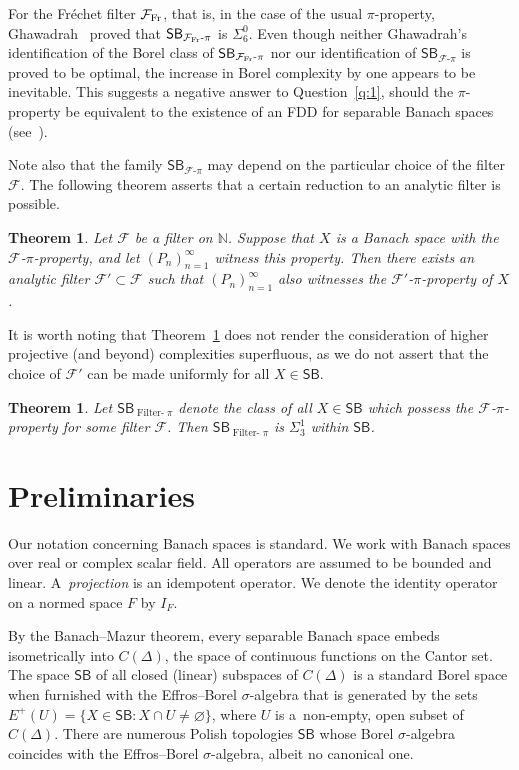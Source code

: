 \documentclass[12pt,fleqn]{amsart}
\newcounter{maintheorem}
\newtheorem{mainth}[maintheorem]{Theorem}
\theoremstyle{definition}
\theoremstyle{remark}
\begin{document}
For the Fréchet filter $\mathcal{F}_{{\rm Fr}}$, that is, in the case of the usual \(\pi\)-property, Ghawadrah~\cite{GhaFund} proved that $\mathsf{SB}_{\mathcal{F}_{{\rm Fr}}\text{-}\pi}$ is $\Sigma^0_6$. Even though neither Ghawadrah's identification of the Borel class of $\mathsf{SB}_{\mathcal{F}_{{\rm Fr}}\text{-}\pi}$ nor our identification of $\mathsf{SB}_{\mathcal{F}\text{-}\pi}$ is proved to be optimal, the increase in Borel complexity by one appears to be inevitable. This suggests a negative answer to Question~\ref{q:1}, should the $\pi$-property be equivalent to the existence of an FDD for separable Banach spaces (see~\cite[Theorem 6.4]{Casazza}).

Note also that the family $\mathsf{SB}_{\mathcal{F}\text{-}\pi}$ may depend on the particular choice of the filter $\mathcal{F}$. The following theorem asserts that a certain reduction to an analytic filter is possible.
%
\begin{mainth}\label{Th:B}
Let $\mathcal{F}$ be a filter on $\mathbb{N}$. Suppose that $X$ is a Banach space with the $\mathcal{F}$-$\pi$-property, and let $(P_n)_{n=1}^\infty$ witness this property. Then there exists an analytic filter $\mathcal{F}' \subset \mathcal{F}$ such that $(P_n)_{n=1}^\infty$ also witnesses the $\mathcal{F}'$-$\pi$-property of $X$.
\end{mainth}
It is worth noting that Theorem~\ref{Th:B} does not render the consideration of higher projective (and beyond) complexities superfluous, as we do not assert that the choice of $\mathcal{F}'$ can be made uniformly for all $X \in \mathsf{SB}$.

\begin{mainth}\label{Th:C}
Let $\mathsf{SB}_{\operatorname{Filter-}\pi}$ denote the class of all $X \in \mathsf{SB}$ which possess the $\mathcal{F}$-$\pi$-property for some filter $\mathcal{F}$. Then $\mathsf{SB}_{\operatorname{Filter-}\pi}$ is $\Sigma^1_3$ within $\mathsf{SB}$.
\end{mainth}
\section{Preliminaries}
Our notation concerning Banach spaces is standard. We work with Banach spaces over real or complex scalar field. All operators are assumed to be bounded and linear. A~\emph{projection} is an idempotent operator. We denote the identity operator on a normed space $F$ by $I_F$.\smallskip 

By the Banach--Mazur theorem, every separable Banach space embeds isometrically into $C(\Delta)$, the space of continuous functions on the Cantor set. The space $\mathsf{SB}$ of all closed (linear) subspaces of $C(\Delta)$ is a standard Borel space when furnished with the Effros--Borel $\sigma$-algebra that is generated by the sets $E^+(U) = \{X\in \mathsf{SB}\colon X\cap U\neq \varnothing\}$, where $U$ is a~non-empty, open subset of $C(\Delta)$. There are numerous Polish topologies $\mathsf{SB}$ whose Borel $\sigma$-algebra coincides with the Effros--Borel $\sigma$-algebra, albeit no canonical one.\smallskip
\end{document}
